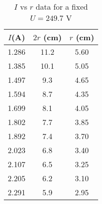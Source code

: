 \begin{table}[H]
\centering
\begin{tabular}{|c|c|c|} \hline
    $I$(A)& $2r$ (cm) & $r$ (cm)  \\ \hline
    1.286 & 11.2 & 5.60  \\
    1.385 & 10.1 & 5.05 \\
    1.497 &  9.3 & 4.65 \\
    1.594 &  8.7 & 4.35 \\
    1.699 &  8.1 & 4.05 \\
    1.802 &  7.7 & 3.85 \\
    1.892 &  7.4 & 3.70 \\
    2.023 &  6.8 & 3.40 \\
    2.107 &  6.5 & 3.25 \\
    2.205 &  6.2 & 3.10 \\
    2.291 &  5.9 & 2.95 \\
    \hline
    \end{tabular}    
    \caption{$I$ vs $r$ data for a fixed $U=249.7$ V}
    \label{tab:2}
\end{table}
